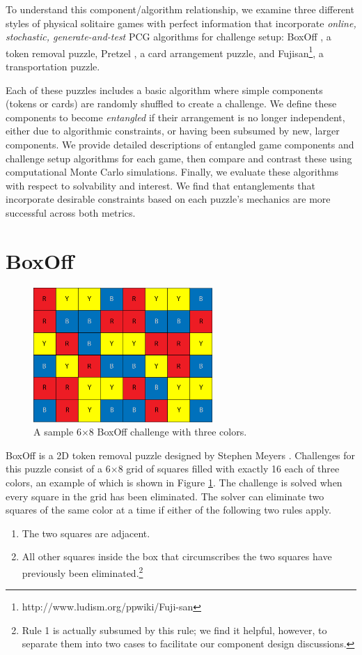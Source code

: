 \documentclass[journal]{IEEEtran}
\begin{document}
To understand this component/algorithm relationship, we examine three different styles of physical solitaire games with perfect information that incorporate {\it online, stochastic, generate-and-test} PCG algorithms for challenge setup: BoxOff \cite{BoxOffGAMES} , a token removal puzzle, Pretzel \cite{de1981pretzel} , a card arrangement puzzle, and Fujisan\footnote{http://www.ludism.org/ppwiki/Fuji-san}, a transportation puzzle.

Each of these puzzles includes a basic algorithm where simple components (tokens or cards) are randomly shuffled to create a challenge. We define these components to become {\it entangled} if their arrangement is no longer independent, either due to algorithmic constraints, or having been subsumed by new, larger components. We provide detailed descriptions of entangled game components and challenge setup algorithms for each game, then compare and contrast these using computational Monte Carlo simulations. Finally, we evaluate these algorithms with respect to solvability and interest. We find that entanglements that incorporate desirable constraints based on each puzzle's mechanics are more successful across both metrics.

%

\section{BoxOff}

\begin{figure}[t]
\centering
\includegraphics[width=6.8cm]{figure1.png}
\caption{A sample 6$\times$8 BoxOff challenge with three colors.}
\label{fig:boxoffbig}
\end{figure}
\noindent
BoxOff is a 2D token removal puzzle designed by Stephen Meyers  \cite{BoxOffGAMES}. Challenges for this puzzle consist of a 6$\times$8 grid of squares filled with exactly 16 each of three colors, an example of which is shown in 
Figure \ref{fig:boxoffbig}. The challenge is solved when every square in the grid has been eliminated.  The solver can eliminate two squares of the same color at a time if either of the following two rules apply.
\begin{enumerate}
    \item The two squares are adjacent.
    \item All other squares inside the box that circumscribes the two squares have previously been eliminated.\footnote{Rule 1 is actually subsumed by this rule; we find it helpful, however, to separate them into two cases to facilitate our component design discussions.}
\end{enumerate}
\end{document}
